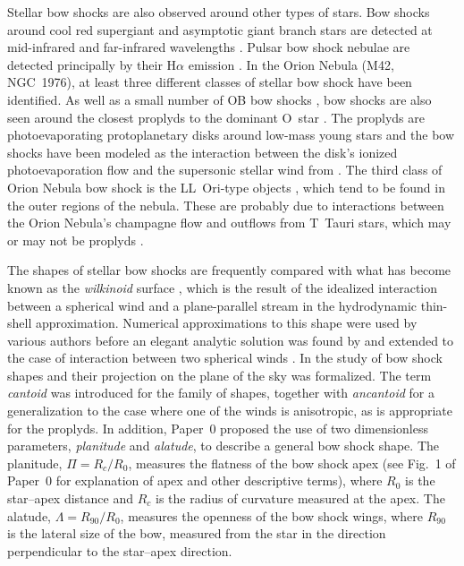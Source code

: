 Stellar bow shocks are also observed around other types of stars. Bow
shocks around cool red supergiant and asymptotic giant branch stars
are detected at mid-infrared and far-infrared wavelengths
\citep{Ueta:2006a, Ueta:2008a, Sahai:2010a, Cox:2012a}.  Pulsar bow
shock nebulae are detected principally by their H\(\alpha\) emission
\citep{Kulkarni:1988a, Brownsberger:2014a}.  In the Orion Nebula (M42,
NGC~1976), at least three different classes of stellar bow shock have
been identified. As well as a small number of OB bow shocks
\citep{Smith:2005a, ODell:2001c}, bow shocks are also seen around the
closest proplyds to the dominant O~star \thC{} \citep{Hayward:1994a,
  Bally:1998a, Robberto:2005a}.  The proplyds \citep{ODell:2008b} are
photoevaporating protoplanetary disks around low-mass young stars
\citep{Johnstone:1998a} and the bow shocks have been modeled as the
interaction between the disk's ionized photoevaporation flow and the
supersonic stellar wind from \thC{} \citep{Garcia-Arredondo:2001a}.
The third class of Orion Nebula bow shock is the LL~Ori-type objects
\citetext{\citealp{Gull:1979a}; \S~5 of \citealp{Bally:2000a}; \S~3.2
  of \citealp{Bally:2001a}; \citealp{Henney:2013a}}, which tend to be
found in the outer regions of the nebula.  These are probably due to
interactions between the Orion Nebula's champagne flow
\citep{Zuckerman:1973a} and outflows from T~Tauri stars, which may or
may not be proplyds \citep{Bally:2000a, Gutierrez-Soto:2015a}.

The shapes of stellar bow shocks are frequently compared with what has
become known as the \textit{wilkinoid} surface \citep{Cox:2012a},
which is the result of the idealized interaction between a spherical
wind and a plane-parallel stream in the hydrodynamic thin-shell
approximation.  Numerical approximations to this shape were used by
various authors \citep{Baranov:1971a, Mac-Low:1991a} before an elegant
analytic solution was found by \citet{Wilkin:1996a} and extended to
the case of interaction between two spherical winds
\citep{Canto:1996}.  In \citet[hereafter, Paper~0]{Tarango-Yong:2018a}
the study of bow shock shapes and their projection on the plane of the
sky was formalized. The term \textit{cantoid} was introduced for the
\citet{Canto:1996} family of shapes, together with \textit{ancantoid}
for a generalization to the case where one of the winds is
anisotropic, as is appropriate for the proplyds.  In addition, Paper~0
proposed the use of two dimensionless parameters, \textit{planitude}
and \textit{alatude}, to describe a general bow shock shape.  The
planitude, \(\Pi = R_c / R_0\), measures the flatness of the bow shock
apex (see Fig.~1 of Paper~0 for explanation of apex and other
descriptive terms), where \(R_0\) is the star--apex distance and
\(R_c\) is the radius of curvature measured at the apex.  The alatude,
\(\Lambda = R_{90}/R_0\), measures the openness of the bow shock wings,
where \(R_{90}\) is the lateral size of the bow, measured from the
star in the direction perpendicular to the star--apex direction.

